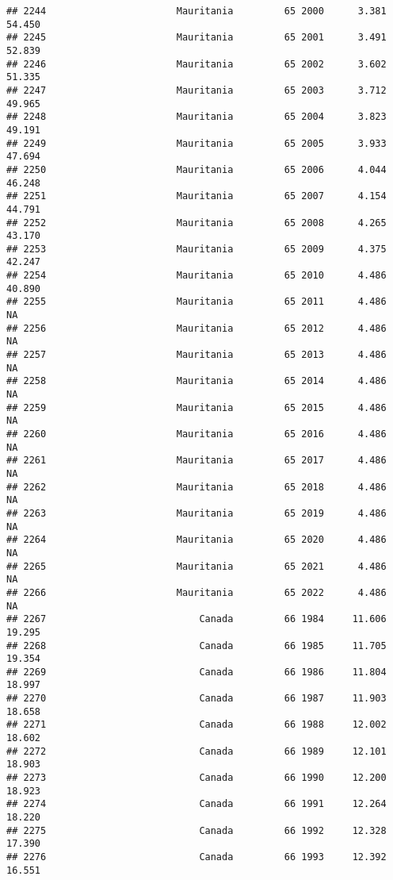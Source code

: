 \documentclass[
]{article}
\begin{document}
\begin{verbatim}
## 2244                       Mauritania         65 2000      3.381     54.450
## 2245                       Mauritania         65 2001      3.491     52.839
## 2246                       Mauritania         65 2002      3.602     51.335
## 2247                       Mauritania         65 2003      3.712     49.965
## 2248                       Mauritania         65 2004      3.823     49.191
## 2249                       Mauritania         65 2005      3.933     47.694
## 2250                       Mauritania         65 2006      4.044     46.248
## 2251                       Mauritania         65 2007      4.154     44.791
## 2252                       Mauritania         65 2008      4.265     43.170
## 2253                       Mauritania         65 2009      4.375     42.247
## 2254                       Mauritania         65 2010      4.486     40.890
## 2255                       Mauritania         65 2011      4.486         NA
## 2256                       Mauritania         65 2012      4.486         NA
## 2257                       Mauritania         65 2013      4.486         NA
## 2258                       Mauritania         65 2014      4.486         NA
## 2259                       Mauritania         65 2015      4.486         NA
## 2260                       Mauritania         65 2016      4.486         NA
## 2261                       Mauritania         65 2017      4.486         NA
## 2262                       Mauritania         65 2018      4.486         NA
## 2263                       Mauritania         65 2019      4.486         NA
## 2264                       Mauritania         65 2020      4.486         NA
## 2265                       Mauritania         65 2021      4.486         NA
## 2266                       Mauritania         65 2022      4.486         NA
## 2267                           Canada         66 1984     11.606     19.295
## 2268                           Canada         66 1985     11.705     19.354
## 2269                           Canada         66 1986     11.804     18.997
## 2270                           Canada         66 1987     11.903     18.658
## 2271                           Canada         66 1988     12.002     18.602
## 2272                           Canada         66 1989     12.101     18.903
## 2273                           Canada         66 1990     12.200     18.923
## 2274                           Canada         66 1991     12.264     18.220
## 2275                           Canada         66 1992     12.328     17.390
## 2276                           Canada         66 1993     12.392     16.551

\end{verbatim}
\end{document}
